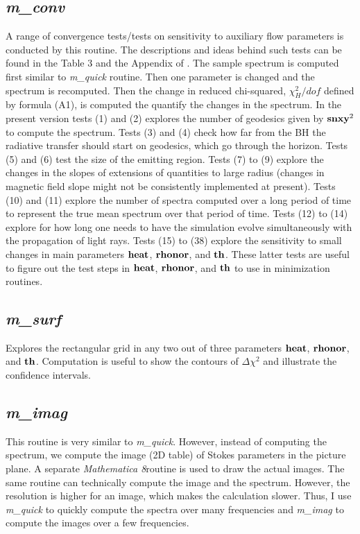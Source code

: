 \documentclass{emulateapj}
\newcommand{\mat}{\textit{Mathematica 8}}
\begin{document}
\subsection{\textit{m\_conv}}
A range of convergence tests/tests on sensitivity to auxiliary flow parameters is conducted by this routine.
The descriptions and ideas behind such tests can be found in the Table 3 and the Appendix of \citet{Shcherbakov:2012appl}.
The sample spectrum is computed first similar to \textit{m\_quick} routine. Then one parameter is changed and the spectrum is recomputed.
Then the change in reduced chi-squared, $\chi^2_H/dof$ defined by formula (A1), is computed the quantify the changes in the spectrum.
In the present version tests (1) and (2) explores the number of geodesics given by ${\bf snxy}^2$ to compute the spectrum.
Tests (3) and (4) check how far from the BH the radiative transfer should start on geodesics, which go through the horizon.
Tests (5) and (6) test the size of the emitting region.
Tests (7) to (9) explore the changes in the slopes of extensions of quantities to large radius (changes in magnetic field slope
might not be consistently implemented at present).
Tests (10) and (11) explore the number of spectra computed over a long period of time to represent the true mean spectrum
over that period of time.
Tests (12) to (14) explore for how long one needs to have the simulation evolve simultaneously with the propagation of light rays.
Tests (15) to (38) explore the sensitivity to small changes in main parameters ${\bf heat}$, ${\bf rhonor}$, and ${\bf th}$.
These latter tests are useful to figure out the test steps in ${\bf heat}$, ${\bf rhonor}$, and ${\bf th}$
to use in minimization routines.

\subsection{\textit{m\_surf}}
Explores the rectangular grid in any two out of three parameters ${\bf heat}$, ${\bf rhonor}$, and ${\bf th}$.
Computation is useful to show the contours of $\Delta\chi^2$ and illustrate the confidence intervals.

\subsection{\textit{m\_imag}}
This routine is very similar to \textit{m\_quick}. However, instead of computing the spectrum, we compute
the image (2D table) of Stokes parameters in the picture plane. A separate \mat  routine is used to draw the actual images.
The same routine can technically compute the image and the spectrum.
However, the resolution is higher for an image, which makes the calculation slower.
Thus, I use \textit{m\_quick} to quickly compute the spectra over many frequencies and \textit{m\_imag} to compute
the images over a few frequencies.
\end{document}
